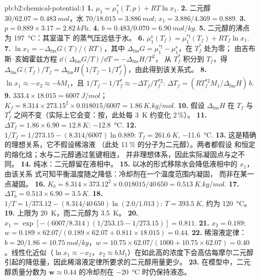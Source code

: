 \begin{solution}{pb:b2:chemical-potential:1}
\textbf{1.} $\mu_1 = \mu_1^*(T, p) + RT\ln x_1$.
\textbf{2.} 二元醇 $30/62.07 = \qty{0.483}{mol}$，水 $70/18.015 =
\qty{3.886}{mol}$; $x_1 = 3.886/4.369 = 0.889$.
\textbf{3.} $p = 0.889 \times 3.17 = \qty{2.82}{kPa}$.
\textbf{4.} $b = 0.483/0.070 = \qty{6.90}{mol/kg}$.
\textbf{5.} 二元醇的沸点为 \qty{197}{\celsius}：其室温下
的蒸气压远低于水。
\textbf{6.} $\mu_1^{\text{s}}(T_f) = \mu_1^{*\text{l}}(T_f) + RT_f\ln x_1$.
\textbf{7.} $\ln x_1 = -\Delta_{\text{fus}}G(T)/(RT)$，其中
$\Delta_{\text{fus}}G = \mu_1^{*\text{l}} - \mu_1^{\text{s}}$，在 $T_f^*$ 处为零；
由吉布斯–亥姆霍兹方程 $\dd(\Delta_{\text{fus}}G/T)/\dd T = -\Delta_{\text{fus}}H/T^2$，
从 $T_f^*$ 积分到 $T_f$，得 $\Delta_{\text{fus}}G(T_f)/T_f =
\Delta_{\text{fus}}H(1/T_f - 1/T_f^*)$，由此得到该关系式。
\textbf{8.} $\ln x_1 \approx -x_2 \approx -bM_1$，且 $1/T_f - 1/T_f^* \approx
-\Delta T_f/T_f^{*2}$: $\Delta T_f = (RT_f^{*2}M_1/\Delta_{\text{fus}}H)\,b$.
\textbf{9.} $333.4 \times 18.015 = \qty{6007}{J/mol}$；$K_f = 8.314 \times
273.15^2 \times 0.018015/6007 = \qty{1.86}{K.kg/mol}$.
\textbf{10.} 假设 $\Delta_{\text{fus}}H$ 在 $T_f$ 与
$T_f^*$ 之间不变（实际上它会变：按，此处每 \qty{3}{K} 约变化 2\,\%）。
\textbf{11.} $\Delta T_f = 1.86 \times 6.90 = \qty{12.8}{K}$: \qty{-12.8}{\celsius}.
\textbf{12.} $1/T_f = 1/273.15 - (8.314/6007)\ln 0.889$: $T_f = \qty{261.6}{K}$,
\qty{-11.6}{\celsius}.
\textbf{13.} 这是精确的理想关系，它不假设稀溶液
（此处 11\,\% 的分子为二元醇）。两者都假设
和恒定的熔化焓；水与二元醇通过氢键相连，
并非理想体系，因此实际凝固点与之不同。
\textbf{14.} 纯冰：二元醇留在液相中。
\textbf{15.} 以冰的形式移除水会降低液相中的 $x_1$，由该关系
式可知平衡温度随之降低：冷却剂在一个温度范围内凝固，
而非在某一点凝固。
\textbf{16.} $K_b = 8.314 \times 373.12^2 \times 0.018015/40\,650 =
\qty{0.513}{K.kg/mol}$.
\textbf{17.} $\Delta T_b = 0.513 \times 6.90 = \qty{3.5}{K}$.
\textbf{18.} $1/T = 1/373.12 - (8.314/40\,650)\ln(2.0/1.013)$: $T = \qty{393.5}{K}$,
约为 \qty{120}{\celsius}。
\textbf{19.} 上限为 \qty{20}{K}，而二元醇为 \qty{3.5}{K}。
\textbf{20.} $x_1 = \exp[-(6007/8.314)(1/253.15 - 1/273.15)] = 0.811$.
\textbf{21.} $x_2 = 0.189$: $w = 0.189 \times 62.07/(0.189 \times 62.07 + 0.811
\times 18.015) = 0.44$.
\textbf{22.} 稀溶液定律：$b = 20/1.86 = \qty{10.75}{mol/kg}$，$w = 10.75 \times
62.07/(1000 + 10.75 \times 62.07) = 0.40$。线性化近似（$\ln x_1 \approx
-x_2$，$x_2 \approx bM_1$）在如此高的浓度下会高估每摩尔二元醇
引起的降低量，因此稀溶液定律所要求的二元醇用量更少。
\textbf{23.} 在模型中，二元醇质量分数为
$\boldsymbol{w \approx 0.44}$ 的冷却剂在 \qty{-20}{\celsius} 时仍保持液态。
\end{solution}

